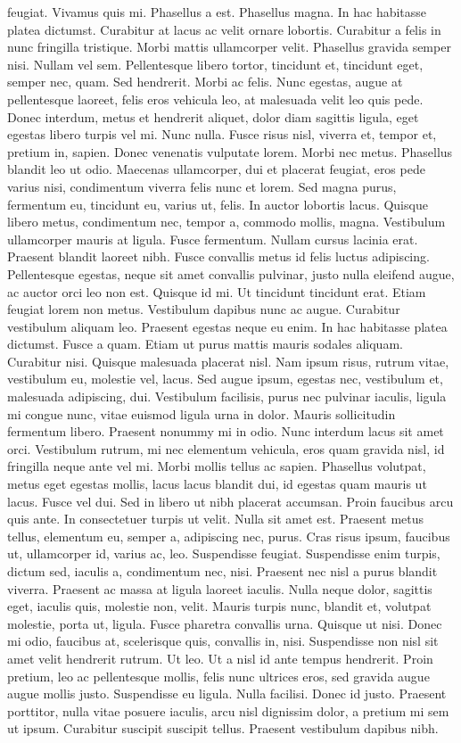 feugiat. Vivamus quis mi. Phasellus a est. Phasellus magna. In hac habitasse platea dictumst. Curabitur at lacus ac velit ornare lobortis. Curabitur a felis in nunc fringilla tristique. Morbi mattis ullamcorper velit. Phasellus gravida semper nisi. Nullam vel sem. Pellentesque libero tortor, tincidunt et, tincidunt eget, semper nec, quam. Sed hendrerit. Morbi ac felis. Nunc egestas, augue at pellentesque laoreet, felis eros vehicula leo, at malesuada velit leo quis pede. Donec interdum, metus et hendrerit aliquet, dolor diam sagittis ligula, eget egestas libero turpis vel mi. Nunc nulla. Fusce risus nisl, viverra et, tempor et, pretium in, sapien. Donec venenatis vulputate lorem. Morbi nec metus. Phasellus blandit leo ut odio. Maecenas ullamcorper, dui et placerat feugiat, eros pede varius nisi, condimentum viverra felis nunc et lorem. Sed magna purus, fermentum eu, tincidunt eu, varius ut, felis. In auctor lobortis lacus. Quisque libero metus, condimentum nec, tempor a, commodo mollis, magna. Vestibulum ullamcorper mauris at ligula. Fusce fermentum. Nullam cursus lacinia erat. Praesent blandit laoreet nibh. Fusce convallis metus id felis luctus adipiscing. Pellentesque egestas, neque sit amet convallis pulvinar, justo nulla eleifend augue, ac auctor orci leo non est. Quisque id mi. Ut tincidunt tincidunt erat. Etiam feugiat lorem non metus. Vestibulum dapibus nunc ac augue. Curabitur vestibulum aliquam leo. Praesent egestas neque eu enim. In hac habitasse platea dictumst. Fusce a quam. Etiam ut purus mattis mauris sodales aliquam. Curabitur nisi. Quisque malesuada placerat nisl. Nam ipsum risus, rutrum vitae, vestibulum eu, molestie vel, lacus. Sed augue ipsum, egestas nec, vestibulum et, malesuada adipiscing, dui. Vestibulum facilisis, purus nec pulvinar iaculis, ligula mi congue nunc, vitae euismod ligula urna in dolor. Mauris sollicitudin fermentum libero. Praesent nonummy mi in odio. Nunc interdum lacus sit amet orci. Vestibulum rutrum, mi nec elementum vehicula, eros quam gravida nisl, id fringilla neque ante vel mi. Morbi mollis tellus ac sapien. Phasellus volutpat, metus eget egestas mollis, lacus lacus blandit dui, id egestas quam mauris ut lacus. Fusce vel dui. Sed in libero ut nibh placerat accumsan. Proin faucibus arcu quis ante. In consectetuer turpis ut velit. Nulla sit amet est. Praesent metus tellus, elementum eu, semper a, adipiscing nec, purus. Cras risus ipsum, faucibus ut, ullamcorper id, varius ac, leo. Suspendisse feugiat. Suspendisse enim turpis, dictum sed, iaculis a, condimentum nec, nisi. Praesent nec nisl a purus blandit viverra. Praesent ac massa at ligula laoreet iaculis. Nulla neque dolor, sagittis eget, iaculis quis, molestie non, velit. Mauris turpis nunc, blandit et, volutpat molestie, porta ut, ligula. Fusce pharetra convallis urna. Quisque ut nisi. Donec mi odio, faucibus at, scelerisque quis, convallis in, nisi. Suspendisse non nisl sit amet velit hendrerit rutrum. Ut leo. Ut a nisl id ante tempus hendrerit. Proin pretium, leo ac pellentesque mollis, felis nunc ultrices eros, sed gravida augue augue mollis justo. Suspendisse eu ligula. Nulla facilisi. Donec id justo. Praesent porttitor, nulla vitae posuere iaculis, arcu nisl dignissim dolor, a pretium mi sem ut ipsum. Curabitur suscipit suscipit tellus. Praesent vestibulum dapibus nibh. 